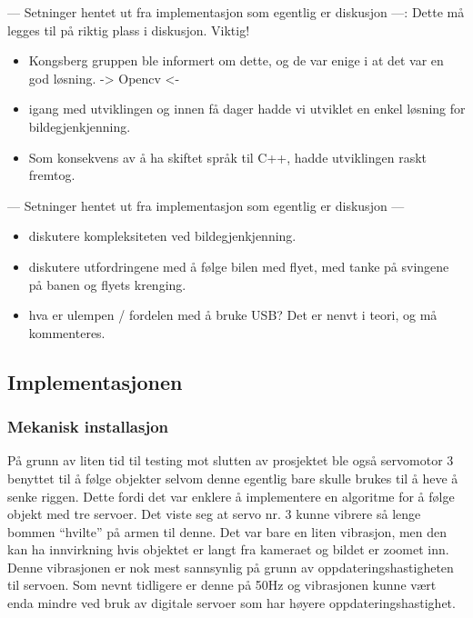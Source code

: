 --- Setninger hentet ut fra implementasjon som egentlig er diskusjon ---: Dette må legges til på riktig plass i diskusjon. Viktig!
\begin{itemize}
\item Kongsberg gruppen ble informert om dette, og de var enige i at det var en god løsning. -> Opencv <-
\item igang med utviklingen og innen få dager hadde vi utviklet en enkel løsning for bildegjenkjenning.
\item Som konsekvens av å ha skiftet språk til C++, hadde utviklingen raskt fremtog. 

\end {itemize}
--- Setninger hentet ut fra implementasjon som egentlig er diskusjon ---

\begin{itemize}
\item diskutere kompleksiteten ved bildegjenkjenning. 

\item diskutere utfordringene med å følge bilen med flyet, med tanke på svingene på banen og flyets krenging.

\item hva er ulempen / fordelen med å bruke USB? Det er nenvt i teori, og må kommenteres. 
\end{itemize}

\subsection{Implementasjonen}
 
\subsubsection{Mekanisk installasjon}


På grunn av liten tid til testing mot slutten av prosjektet ble også servomotor 3 benyttet til å følge objekter selvom denne egentlig bare skulle brukes til å heve å senke riggen. Dette fordi det var enklere å implementere en algoritme for å følge objekt med tre servoer. Det viste seg at servo nr. 3 kunne vibrere så lenge bommen ``hvilte'' på armen til denne. Det var bare en liten vibrasjon, men den kan ha innvirkning hvis objektet er langt fra kameraet og bildet er zoomet inn. Denne vibrasjonen er nok mest sannsynlig på grunn av oppdateringshastigheten til servoen. Som nevnt tidligere er denne på 50Hz og vibrasjonen kunne vært enda mindre ved bruk av digitale servoer som har høyere oppdateringshastighet.  


